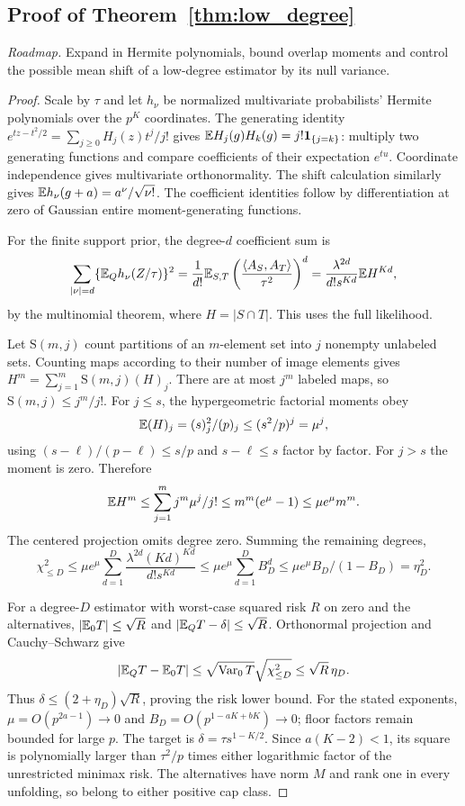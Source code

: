 \subsection{Proof of Theorem~\ref{thm:low_degree}}
\noindent\emph{Roadmap.} Expand in Hermite polynomials, bound overlap moments and control the possible mean shift of a low-degree estimator by its null variance.
\begin{proof}
Scale by $\tau$ and let $h_\nu$ be normalized multivariate probabilists' Hermite polynomials over the $p^K$ coordinates.
The generating identity
$e^{tz-t^2/2}=\sum_{j\ge0}H_j(z)t^j/j!$
gives $\mathbb E H_j(g)H_k(g)=j!\mathbf1_{\{j=k\}}$:
multiply two generating functions and compare coefficients of their expectation $e^{tu}$.
Coordinate independence gives multivariate orthonormality.
The shift calculation similarly gives
$\mathbb E h_\nu(g+a)=a^\nu/\sqrt{\nu!}$.
The coefficient identities follow by differentiation at zero of Gaussian entire moment-generating functions.

For the finite support prior, the degree-$d$ coefficient sum is
\[
 \sum_{|\nu|=d}\{\mathbb E_Qh_\nu(Z/\tau)\}^2
 =\frac1{d!}\mathbb E_{S,T}
      \left(\frac{\langle A_S,A_T\rangle}{\tau^2}\right)^d
 =\frac{\lambda^{2d}}{d!s^{Kd}}\mathbb E H^{Kd},
\]
by the multinomial theorem, where $H=|S\cap T|$.
This uses the full likelihood.

Let $\mathrm S(m,j)$ count partitions of an $m$-element set into $j$ nonempty unlabeled sets.
Counting maps according to their number of image elements gives
$H^m=\sum_{j=1}^m\mathrm S(m,j)(H)_j$.
There are at most $j^m$ labeled maps, so
$\mathrm S(m,j)\le j^m/j!$.
For $j\le s$, the hypergeometric factorial moments obey
\[
 \mathbb E(H)_j=(s)_j^2/(p)_j\le(s^2/p)^j=\mu^j,
\]
using $(s-\ell)/(p-\ell)\le s/p$ and $s-\ell\le s$ factor by factor.
For $j>s$ the moment is zero. Therefore
\[
 \mathbb E H^m\le\sum_{j=1}^m j^m\mu^j/j!
 \le m^m(e^\mu-1)\le\mu e^\mu m^m.
\]
The centered projection omits degree zero. Summing the remaining degrees,
\[
 \chi^2_{\le D}
 \le\mu e^\mu\sum_{d=1}^D
      \frac{\lambda^{2d}(Kd)^{Kd}}{d!s^{Kd}}
 \le\mu e^\mu\sum_{d=1}^D B_D^d
 \le\mu e^\mu B_D/(1-B_D)=\eta_D^2.
\]

For a degree-$D$ estimator with worst-case squared risk $R$ on zero and the alternatives,
$|\mathbb E_0T|\le\sqrt R$ and $|\mathbb E_QT-\delta|\le\sqrt R$.
Orthonormal projection and Cauchy--Schwarz give
\[
 |\mathbb E_QT-\mathbb E_0T|\le
 \sqrt{\operatorname{Var}_0T}\sqrt{\chi^2_{\le D}}\le\sqrt R\,\eta_D.
\]
Thus $\delta\le(2+\eta_D)\sqrt R$, proving the risk lower bound.
For the stated exponents,
$\mu=O(p^{2a-1})\to0$ and $B_D=O(p^{1-aK+bK})\to0$;
floor factors remain bounded for large $p$.
The target is $\delta=\tau s^{1-K/2}$.
Since $a(K-2)<1$, its square is polynomially larger than
$\tau^2/p$ times either logarithmic factor of the unrestricted minimax risk.
The alternatives have norm $M$ and rank one in every unfolding, so belong to either positive cap class.
\end{proof}

